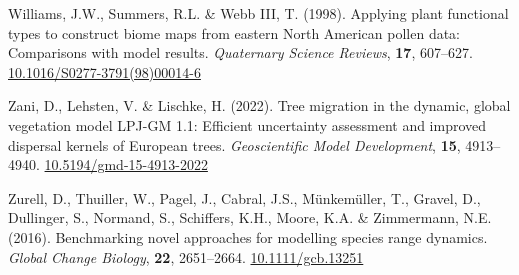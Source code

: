 \documentclass[11pt,]{article}
\newlength{\cslhangindent}
\newenvironment{CSLReferences}[2] %
 {%
  \setlength{\parindent}{0pt}
  \ifodd #1 \everypar{\setlength{\hangindent}{\cslhangindent}}\ignorespaces\fi
  \ifnum #2 > 0
  \setlength{\parskip}{#2\baselineskip}
  \fi
 }%
 {}
\begin{document}
\begin{CSLReferences}{1}{0}
\leavevmode{}%
Williams, J.W., Summers, R.L. \& Webb III, T. (1998). Applying plant
functional types to construct biome maps from eastern {North} {American}
pollen data: Comparisons with model results. \emph{Quaternary Science
Reviews}, \textbf{17}, 607--627.
\href{https://doi.org/10.1016/S0277-3791(98)00014-6}{10.1016/S0277-3791(98)00014-6}

\leavevmode{}%
Zani, D., Lehsten, V. \& Lischke, H. (2022). Tree migration in the
dynamic, global vegetation model {LPJ}-{GM} 1.1: Efficient uncertainty
assessment and improved dispersal kernels of {European} trees.
\emph{Geoscientific Model Development}, \textbf{15}, 4913--4940.
\href{https://doi.org/10.5194/gmd-15-4913-2022}{10.5194/gmd-15-4913-2022}

\leavevmode{}%
Zurell, D., Thuiller, W., Pagel, J., Cabral, J.S., Münkemüller, T.,
Gravel, D., Dullinger, S., Normand, S., Schiffers, K.H., Moore, K.A. \&
Zimmermann, N.E. (2016). Benchmarking novel approaches for modelling
species range dynamics. \emph{Global Change Biology}, \textbf{22},
2651--2664. \href{https://doi.org/10.1111/gcb.13251}{10.1111/gcb.13251}

\end{CSLReferences}





\newpage
\singlespacing
\printbibliography
\end{document}
